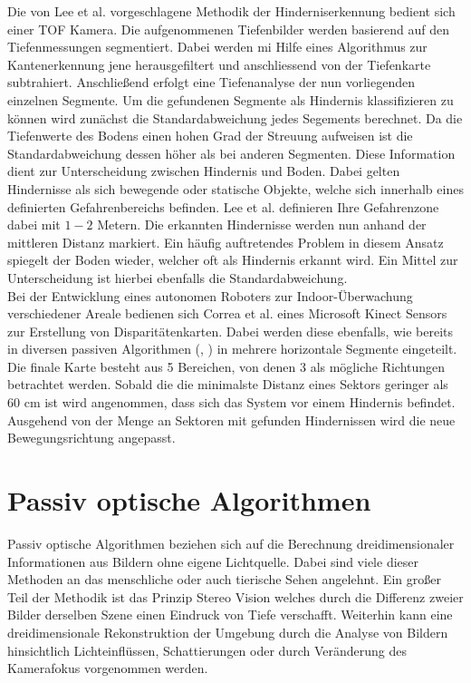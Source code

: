 \noindent
Die von Lee et al. \cite{lee2012intelligent} vorgeschlagene Methodik der Hinderniserkennung bedient sich einer TOF Kamera. Die aufgenommenen Tiefenbilder werden basierend auf den Tiefenmessungen segmentiert. Dabei werden mi Hilfe eines Algorithmus zur Kantenerkennung jene herausgefiltert und anschliessend von der Tiefenkarte subtrahiert. Anschließend erfolgt eine Tiefenanalyse der nun vorliegenden einzelnen Segmente. Um die gefundenen Segmente als Hindernis klassifizieren zu können wird zunächst die Standardabweichung jedes Segements berechnet. Da die Tiefenwerte des Bodens einen hohen Grad der Streuung aufweisen ist die Standardabweichung dessen höher als bei anderen Segmenten. Diese Information dient zur Unterscheidung zwischen Hindernis und Boden. Dabei gelten Hindernisse als sich bewegende oder statische Objekte, welche sich innerhalb eines definierten Gefahrenbereichs befinden. Lee et al. definieren Ihre Gefahrenzone dabei mit $1-2$ Metern. Die erkannten Hindernisse werden nun anhand der mittleren Distanz markiert. Ein häufig auftretendes Problem in diesem Ansatz spiegelt der Boden wieder, welcher oft als Hindernis erkannt wird. Ein Mittel zur Unterscheidung ist hierbei ebenfalls die Standardabweichung.\\

\noindent
Bei der Entwicklung eines autonomen Roboters zur Indoor-Überwachung verschiedener Areale bedienen sich Correa et al. \cite{correa2012mobile} eines Microsoft Kinect Sensors zur Erstellung von Disparitätenkarten. Dabei werden diese ebenfalls, wie bereits in diversen passiven Algorithmen (\cite{pire2012stereo}, \cite{kostavelis2010comparative}) in mehrere horizontale Segmente eingeteilt. Die finale Karte besteht aus 5 Bereichen, von denen 3 als mögliche Richtungen betrachtet werden. Sobald die die minimalste Distanz eines Sektors geringer als 60 cm ist wird angenommen, dass sich das System vor einem Hindernis befindet. Ausgehend von der Menge an Sektoren mit gefunden Hindernissen wird die neue Bewegungsrichtung angepasst.

\section{Passiv optische Algorithmen}
\label{sec:sensor_basierte_he}
Passiv optische Algorithmen beziehen sich auf die Berechnung dreidimensionaler Informationen aus Bildern ohne eigene Lichtquelle. Dabei sind viele dieser Methoden an das menschliche oder auch tierische Sehen angelehnt. Ein großer Teil der Methodik ist das Prinzip Stereo Vision welches durch die Differenz zweier Bilder derselben Szene einen Eindruck von Tiefe verschafft. 
Weiterhin kann eine dreidimensionale Rekonstruktion der Umgebung durch die Analyse von Bildern hinsichtlich Lichteinflüssen, Schattierungen oder durch Veränderung des Kamerafokus vorgenommen werden.\\

